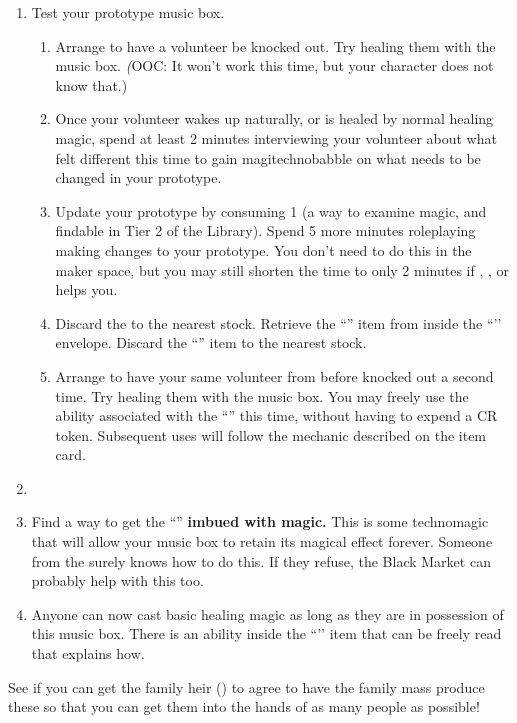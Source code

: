 \documentclass[green]{GL2020}
\begin{document}
\begin{enumerate}
  \item Test your prototype music box.
  \begin{enumerate}
\item Arrange to have a volunteer be knocked out. Try healing them with the music box. \emph(OOC: It won’t work this time, but your character does not know that.)
 	\item Once your volunteer wakes up naturally, or is healed by normal healing magic, spend at least 2 minutes interviewing your volunteer about what felt different this time to gain magitechnobabble on what needs to be changed in your prototype.
\item Update your prototype by consuming 1 \iCrystalLens{} (a way to examine magic, and findable in Tier 2 of the Library). Spend 5 more minutes roleplaying making changes to your prototype. You don’t need to do this in the maker space, but you may still shorten the time to only 2 minutes if \cChupInventor{\full}, \cPirate{\full}, \cBunker{\full} or \cTechStar{\full} helps you.
\item Discard the \iCrystalLens{} to the nearest stock. Retrieve the ``\iMagicMusicBox{}'' item from inside the ``\iProtypeMusicBox{}’’ envelope. Discard the ``\iProtypeMusicBox{}'' item to the nearest stock.
\item Arrange to have your same volunteer from before knocked out a second time. Try healing them with the music box. You may freely use the ability associated with the ``\iMagicMusicBox{}'' this time, without having to expend a CR token. Subsequent uses will follow the mechanic described on the item card.
  \end{enumerate}
  \item 


  \item Find a way to get the ``\iMagicMusicBox{}'' \textbf{imbued with magic.} This is some technomagic that will allow your music box to retain its magical effect forever. Someone from the \pTech{} surely knows how to do this. If they refuse, the Black Market can probably help with this too.
  \item Anyone can now cast basic healing magic as long as they are in possession of this music box. There is an ability inside the ``\iMagicMusicBox{}’’ item that can be freely read that explains how.
\end{enumerate}

See if you can get the \cHeir{\formal} family heir (\cHeir{\full}) to agree to have the family mass produce these so that you can get them into the hands of as many people as possible!
\end{document}
